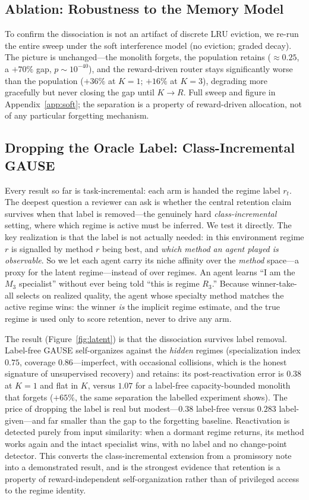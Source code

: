 \documentclass[10pt]{article}
\begin{document}
\subsection{Ablation: Robustness to the Memory Model}

To confirm the dissociation is not an artifact of discrete LRU eviction, we re-run
the entire sweep under the soft interference model (no eviction; graded decay).
The picture is unchanged---the monolith forgets, the population retains
($\approx 0.25$, a $+70\%$ gap, $p\sim10^{-40}$), and the reward-driven router
stays significantly worse than the population ($+36\%$ at $K{=}1$; $+16\%$ at
$K{=}3$), degrading more gracefully but never closing the gap until $K\to R$. Full
sweep and figure in Appendix~\ref{app:soft}; the separation is a property of
reward-driven allocation, not of any particular forgetting mechanism.

\subsection{Dropping the Oracle Label: Class-Incremental GAUSE}
\label{sec:latent}

Every result so far is task-incremental: each arm is handed the regime label
$r_t$. The deepest question a reviewer can ask is whether the central
retention claim survives when that label is removed---the genuinely hard
\emph{class-incremental} setting, where which regime is active must be inferred. We
test it directly. The key realization is that the label is not actually needed: in
this environment regime $r$ is signalled by method $r$ being best, and \emph{which
method an agent played is observable}. So we let each agent carry its niche
affinity over the \emph{method} space---a proxy for the latent regime---instead of
over regimes. An agent learns ``I am the $M_3$ specialist'' without ever being told
``this is regime $R_3$.'' Because winner-take-all selects on realized quality, the
agent whose specialty method matches the active regime wins: the winner \emph{is}
the implicit regime estimate, and the true regime is used only to score retention,
never to drive any arm.

The result (Figure~\ref{fig:latent}) is that the dissociation survives label
removal. Label-free GAUSE self-organizes against the \emph{hidden} regimes
(specialization index $0.75$, coverage $0.86$---imperfect, with occasional
collisions, which is the honest signature of unsupervised recovery) and retains:
its post-reactivation error is $0.38$ at $K{=}1$ and flat in $K$, versus $1.07$ for
a label-free capacity-bounded monolith that forgets ($+65\%$, the same separation
the labelled experiment shows). The price of dropping the label is real but
modest---$0.38$ label-free versus $0.283$ label-given---and far smaller than the
gap to the forgetting baseline. Reactivation is detected purely from input
similarity: when a dormant regime returns, its method works again and the intact
specialist wins, with no label and no change-point detector. This converts the
class-incremental extension from a promissory note into a demonstrated result, and
is the strongest evidence that retention is a property of reward-independent
self-organization rather than of privileged access to the regime identity.
\end{document}
